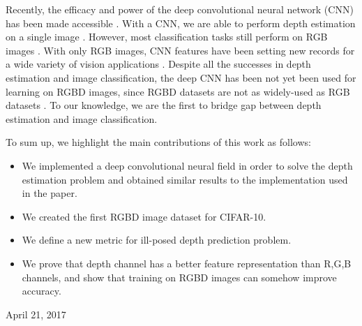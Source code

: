 \documentclass[journal]{IEEEtran}
\begin{document}
	Recently, the efficacy and power of the deep
	convolutional neural network (CNN) has been made accessible \cite{krizhevsky2012imagenet,Simonyan2014}. 
	With a CNN, we are able to perform depth estimation on a single image \cite{liu2015deep}.
	However, most classification tasks still perform on RGB images \cite{He2015,he2016identity,xie2016aggregated}.
	With only RGB images, CNN features have been setting new records for a wide variety of vision applications \cite{razavian2014cnn,fasterrcnn,long2015fully}.
	Despite all the successes in depth estimation and image classification,
	the deep CNN has been not yet been used for learning on RGBD images, since RGBD datasets are not as widely-used as RGB datasets .
	To our knowledge, we are the first to bridge gap between depth estimation and image classification.
	
	To sum up, we highlight the main contributions of this work as follows:
	\begin{itemize}
		\vspace{-.12cm} \item 
		We implemented a deep convolutional neural field in order to solve the depth estimation problem and obtained similar results to the implementation used in the paper.
		\vspace{-.12cm} \item
		We created the first RGBD image dataset for CIFAR-10.
		\vspace{-.12cm} \item 
		We define a new metric for ill-posed depth prediction problem.
		\vspace{-.12cm} \item 
		We prove that depth channel has a better feature representation than R,G,B channels,
		and show that training on RGBD images can somehow improve accuracy.
	\end{itemize}
	
	
	\hfill April 21, 2017
	
	
	
\end{document}

